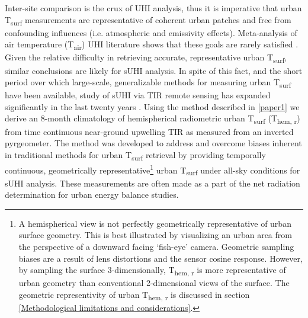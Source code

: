 Inter-site comparison is the crux of UHI analysis, thus it is imperative that urban T\textsubscript{surf} measurements are representative of coherent urban patches and free from confounding influences (i.e. atmospheric and emissivity effects). Meta-analysis of air temperature (T\textsubscript{air}) UHI literature shows that these goals are rarely satisfied \cite{Stewart2011}. Given the relative difficulty in retrieving accurate, representative urban T\textsubscript{surf}, similar conclusions are likely for sUHI analysis. In spite of this fact, and the short period over which large-scale, generalizable methods for measuring urban T\textsubscript{surf} have been available, study of sUHI via TIR remote sensing has expanded significantly in the last twenty years \cite{Peng2012,Voogt2003}. Using the method described in \ref{paper1} we derive an 8-month climatology of hemispherical radiometric urban T\textsubscript{surf} (T\textsubscript{hem, r}) from time continuous near-ground upwelling TIR as measured from an inverted pyrgeometer. The method was developed to address and overcome biases inherent in traditional methods for urban T\textsubscript{surf} retrieval by providing temporally continuous, geometrically representative\footnote{A hemispherical view is not perfectly geometrically representative of urban surface geometry. This is best illustrated by visualizing an urban area from the perspective of a downward facing ‘fish-eye’ camera. Geometric sampling biases are a result of lens distortions and the sensor cosine response. However, by sampling the surface 3-dimensionally, T\textsubscript{hem, r} is more representative of urban geometry than conventional 2-dimensional views of the surface. The geometric representivity of urban T\textsubscript{hem, r} is discussed in section \ref{Methodological limitations and considerations}.} urban T\textsubscript{surf} under all-sky conditions for sUHI analysis. These measurements are often made as a part of the net radiation determination for urban energy balance studies.

